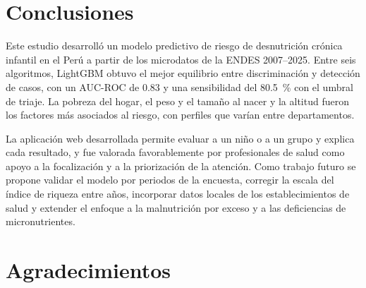 \documentclass[final,5p,times,twocolumn,authoryear,lefttitle]{elsarticle}
\begin{document}
\section{Conclusiones}

Este estudio desarrolló un modelo predictivo de riesgo de desnutrición crónica infantil en el Perú a partir de los microdatos de la ENDES 2007--2025. Entre seis algoritmos, LightGBM obtuvo el mejor equilibrio entre discriminación y detección de casos, con un AUC-ROC de 0.83 y una sensibilidad del 80.5~\% con el umbral de triaje. La pobreza del hogar, el peso y el tamaño al nacer y la altitud fueron los factores más asociados al riesgo, con perfiles que varían entre departamentos.

La aplicación web desarrollada permite evaluar a un niño o a un grupo y explica cada resultado, y fue valorada favorablemente por profesionales de salud como apoyo a la focalización y a la priorización de la atención. Como trabajo futuro se propone validar el modelo por periodos de la encuesta, corregir la escala del índice de riqueza entre años, incorporar datos locales de los establecimientos de salud y extender el enfoque a la malnutrición por exceso y a las deficiencias de micronutrientes.

\FloatBarrier
\section*{Agradecimientos}
 







\end{document}

